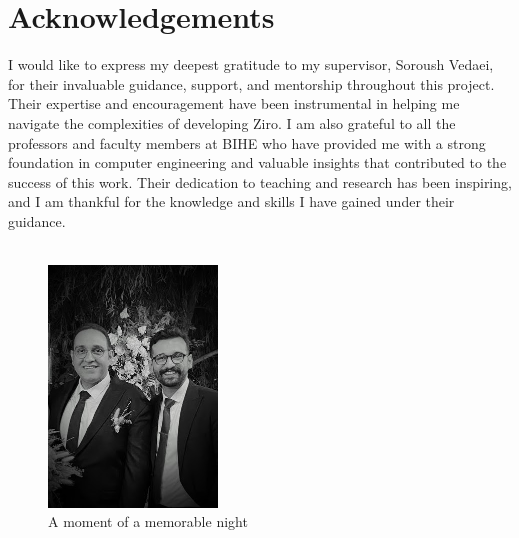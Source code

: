 \section{Acknowledgements}

I would like to express my deepest gratitude to my supervisor, Soroush Vedaei, for their invaluable guidance, support, and mentorship throughout this project. Their expertise and encouragement have been instrumental in helping me navigate the complexities of developing Ziro. I am also grateful to all the professors and faculty members at BIHE who have provided me with a strong foundation in computer engineering and valuable insights that contributed to the success of this work. Their dedication to teaching and research has been inspiring, and I am thankful for the knowledge and skills I have gained under their guidance.
\\
\\
\begin{figure}[H]
	\centering
	\includegraphics[width=0.4\textwidth]{Supervisor.jpg}
	\caption{A moment of a memorable night}
	\label{fig:supervisor}
\end{figure}

\pagebreak
